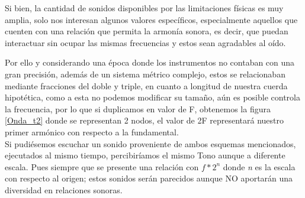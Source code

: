 \documentclass{book}
\begin{document}
	Si bien, la cantidad de sonidos disponibles por las limitaciones físicas es muy amplia, solo nos interesan algunos valores específicos, especialmente aquellos que cuenten con una relación que permita la armonía sonora, es decir, que puedan interactuar sin ocupar las mismas frecuencias y estos sean agradables al oído.\par 
	
	Por ello y considerando una época donde los instrumentos no contaban con una gran precisión, además de un sistema métrico complejo, estos se relacionaban mediante fracciones del doble y triple, en cuanto a longitud de nuestra cuerda hipotética, como a esta no podemos modificar su tamaño, aún es posible controla la frecuencia, por lo que si duplicamos en valor de F, obtenemos la figura \ref{Onda_t2} donde se representan 2 nodos, el valor de 2F representará nuestro primer armónico con respecto a la fundamental.\\
	Si pudiésemos escuchar un sonido proveniente de ambos esquemas mencionados, ejecutados al mismo tiempo, percibiríamos el mismo Tono aunque a diferente escala. Pues siempre que se presente una relación con $f * 2^{n}$ donde \emph{n} es la escala con respecto al origen; estos sonidos serán parecidos aunque NO  aportarán una diversidad en relaciones sonoras.\par 
	
\end{document}
